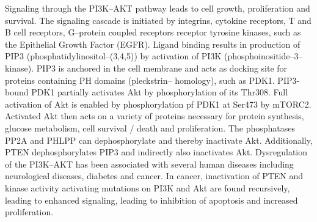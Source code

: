 {{{      Signaling through the PI3K--AKT pathway leads to cell growth,
      proliferation and survival. The signaling cascade is initiated by
      integrins, cytokine receptors, T and B cell receptors, G--protein coupled
      receptors receptor tyrosine kinases, such as the Epithelial Growth Factor
      (EGFR). Ligand binding results in production of PIP3
      (phosphatidylinositol--(3,4,5)) by activation of PI3K
      (phosphoinositide--3--kinase). PIP3 is anchored in the cell membrane and
      acts as docking site for proteins containing PH domains (pleckstrin--
      homology), such as PDK1. PIP3-bound PDK1 partially activates Akt by
      phosphorylation of its Thr308. Full activation of Akt is enabled by
      phosphorylation pf PDK1 at Ser473 by mTORC2. Activated Akt then acts on a
      variety of proteins necessary for protein synthesis, glucose metabolism,
      cell survival / death and proliferation. The phosphatases PP2A and PHLPP
      can dephosphorylate and thereby inactivate Akt. Additionally, PTEN
      dephosphorylates PIP3 and indirectly also inactivates Akt. Dysregulation
      of the PI3K--AKT has been associated with several human diseases including
      neurological diseases, diabetes and cancer. In cancer, inactivation of
      PTEN and kinase activity activating mutations on PI3K and Akt are found
      recursively, leading to enhanced signaling, leading to inhibition of
      apoptosis and increased proliferation.

}}}

